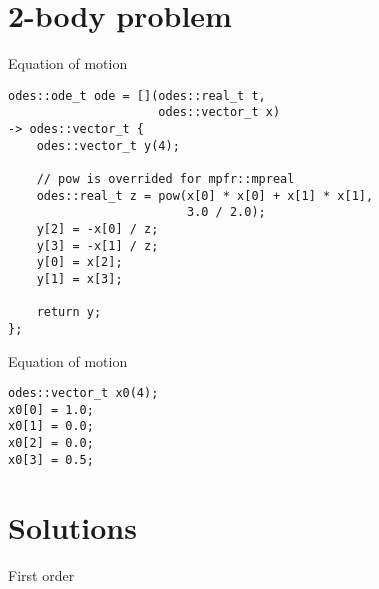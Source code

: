 \documentclass[10pt]{beamer}
\begin{document}
\section{2-body problem}

\begin{frame}[fragile]{Equation of motion}
  \begin{verbatim}
odes::ode_t ode = [](odes::real_t t,
                     odes::vector_t x)
-> odes::vector_t {
    odes::vector_t y(4);

    // pow is overrided for mpfr::mpreal
    odes::real_t z = pow(x[0] * x[0] + x[1] * x[1],
                         3.0 / 2.0);
    y[2] = -x[0] / z;
    y[3] = -x[1] / z;
    y[0] = x[2];
    y[1] = x[3];

    return y;
};
  \end{verbatim}
\end{frame}

\begin{frame}[fragile]{Equation of motion}
  \begin{verbatim}
odes::vector_t x0(4);
x0[0] = 1.0;
x0[1] = 0.0;
x0[2] = 0.0;
x0[3] = 0.5;
  \end{verbatim}
\end{frame}

\section{Solutions}

\begin{frame}{First order}
  \begin{figure}
  \end{figure}
\end{frame}
\end{document}
